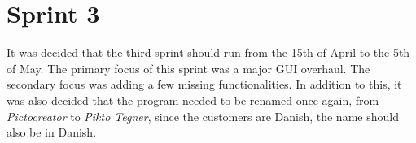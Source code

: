 \chapter{Sprint 3}
It was decided that the third sprint should run from the 15th of April to the 5th of May.
The primary focus of this sprint was a major GUI overhaul.
The secondary focus was adding a few missing functionalities.
In addition to this, it was also decided that the program needed to be renamed once again, from \textit{Pictocreator} to \textit{Pikto Tegner}, since the customers are Danish, the name should also be in Danish.




